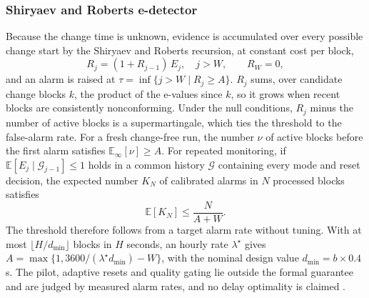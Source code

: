 \documentclass[preprint,12pt]{elsarticle}
\newcommand{\E}{\mathbb{E}}
\newcommand{\1}{\mathbf{1}}
\begin{document}
\subsubsection{Shiryaev and Roberts e-detector}
\label{sec:alarmbudget}
Because the change time is unknown, evidence is accumulated over every possible change start by the Shiryaev and Roberts recursion, at constant cost per block,
\begin{equation}
R_j=(1+R_{j-1})\,E_j,\quad j>W,\qquad R_W=0,
\label{eq:sr}
\end{equation}
and an alarm is raised at $\tau=\inf\{j>W\mid R_j\ge A\}$. $R_j$ sums, over candidate change blocks $k$, the product of the e-values since $k$, so it grows when recent blocks are consistently nonconforming. Under the null conditions, $R_j$ minus the number of active blocks is a supermartingale, which ties the threshold to the false-alarm rate. For a fresh change-free run, the number $\nu$ of active blocks before the first alarm satisfies $\E_\infty[\nu]\ge A$. For repeated monitoring, if $\E[E_j\mid\mathcal G_{j-1}]\le1$ holds in a common history $\mathcal G$ containing every mode and reset decision, the expected number $K_N$ of calibrated alarms in $N$ processed blocks satisfies
\begin{equation}
\E[K_N]\le\frac{N}{A+W}.
\label{eq:alarmcount}
\end{equation}
The threshold therefore follows from a target alarm rate without tuning. With at most $\lfloor H/d_{\min}\rfloor$ blocks in $H$ seconds, an hourly rate $\lambda^\star$ gives $A=\max\{1,3600/(\lambda^\star d_{\min})-W\}$, with the nominal design value $d_{\min}=b\times0.4$\,s. The pilot, adaptive resets and quality gating lie outside the formal guarantee and are judged by measured alarm rates, and no delay optimality is claimed \cite{bhattacharyya2026conformal}.
\end{document}
